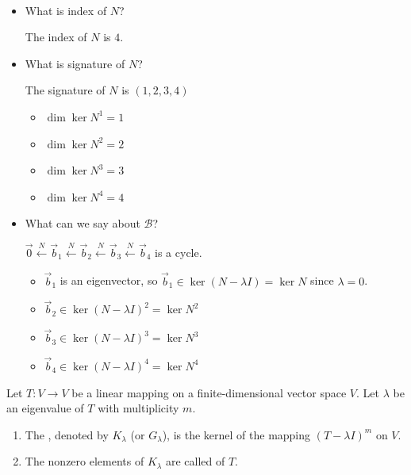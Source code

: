 \documentclass[11pt,fleqn]{book} %
\begin{document}
\setcounter{exampleT}{3}
\begin{example}[count.]
$\text{ }$

    \begin{itemize}
        \item What is index of $N$?
        
        The index of $N$ is $4$. 
        
        \item What is signature of $N$?
        
        The signature of $N$ is $(1, 2, 3, 4)$
        
        \begin{itemize}
            \item $\dim \ker N^1 = 1$
            \item $\dim \ker N^2 = 2$
            \item $\dim \ker N^3 = 3$
            \item $\dim \ker N^4 = 4$
        \end{itemize}
        
        \item What can we say about $\mathcal{B}$?
        
        $\vec{0} \overset{N}{\longleftarrow}\vec{b}_1 \overset{N}{\longleftarrow} \vec{b}_2\overset{N}{\longleftarrow} \vec{b}_3 \overset{N}{\longleftarrow} \vec{b}_4$ is a cycle. 
        
        \begin{itemize}
            \item $\vec{b}_1$ is an eigenvector, so $\vec{b}_1 \in \ker(N - \lambda I) = \ker N$ since $\lambda = 0$.
            \item $\vec{b}_2 \in \ker (N - \lambda I)^2 = \ker N^2$
            \item $\vec{b}_3 \in \ker (N - \lambda I)^3 = \ker N^3$
            \item $\vec{b}_4 \in \ker (N - \lambda I)^4 = \ker N^4$
        \end{itemize}
    \end{itemize}
\end{example}

\setcounter{chapter}{6}
\setcounter{definitionT}{1}
\begin{definition}
    Let $T: V \to V$ be a linear mapping on a finite-dimensional vector space $V$. Let $\lambda$ be an eigenvalue of $T$ with multiplicity $m$.
    
    \begin{enumerate}[label=\alph*)]
        \item The , denoted by $K_\lambda$ (or $G_\lambda$), is the kernel of the mapping $(T - \lambda I)^m$ on $V$.
        \item The nonzero elements of $K_\lambda$ are called  of $T$.
    \end{enumerate}
\end{definition}
\setcounter{chapter}{4}
\end{document}
